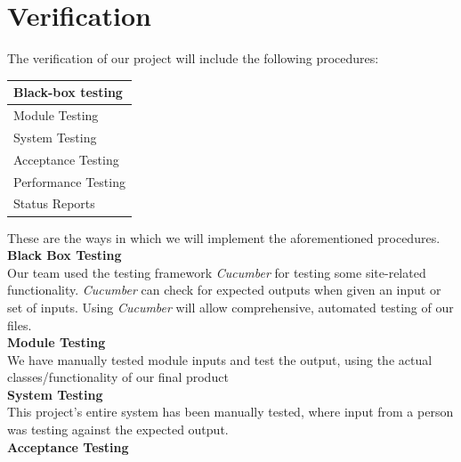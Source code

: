 \documentclass[11pt]{article}
\begin{document}
\clearpage
\pagebreak[4]

\section{Verification} \label{sec:verify}
The verification of our project will include the following procedures: \\
\begin{adjustwidth}{.75in}{}
  \begin{tabular}{|| l ||}
    \hline
    Black-box testing \\ \hline
    Module Testing \\ \hline
    System Testing \\ \hline
    Acceptance Testing \\ \hline
    Performance Testing \\ \hline
    Status Reports \\ \hline
  \end{tabular}
\end{adjustwidth}
\vspace{.1in}

These are the ways in which we will implement the aforementioned procedures. \\

\hspace{-.5in} \textbf{Black Box Testing} \\

Our team used the testing framework \textit{Cucumber} for testing some site-related functionality. \textit{Cucumber} can check for expected outputs when given an input
or set of inputs. Using \textit{Cucumber} will allow comprehensive, automated testing of our files. \\

\hspace{-.5in} \textbf{Module Testing} \\

We have manually tested module inputs and test the output, using the actual classes/functionality of our final product \\

\hspace{-.5in} \textbf{System Testing} \\

This project's entire system has been manually tested, where input from a person was testing against the expected output. \\

\hspace{-.5in} \textbf{Acceptance Testing} \\
\end{document}
